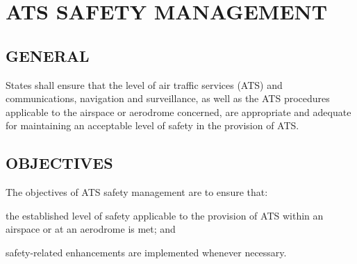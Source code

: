 
\chapterbegin

\section[ATS Safety Management]{ATS SAFETY MANAGEMENT}

\subsection[General]{GENERAL}

\begin{enumnoss}
    \item States shall ensure that the level of air traffic services (ATS) and communications, navigation and surveillance, as well as the ATS procedures applicable to the airspace or aerodrome concerned, are appropriate and adequate for maintaining an acceptable level of safety in the provision of ATS.
\end{enumnoss}

\subsection[Objectives]{OBJECTIVES}

The objectives of ATS safety management are to ensure that:

\begin{enumalph}
    \item the established level of safety applicable to the provision of ATS within an airspace or at an aerodrome is met; and
    \item safety-related enhancements are implemented whenever necessary.
\end{enumalph}

\chapterend